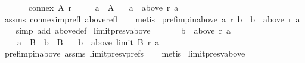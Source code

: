 \begin{isabellebody}
\ \ \isanewline
\ \ \ \ {\isachardoublequoteopen}connex\ A\ r{\isachardoublequoteclose}\ \isanewline
\ \ \ \ {\isachardoublequoteopen}a\ {\isasymin}\ A{\isachardoublequoteclose}\isanewline
\ \ \ {\isachardoublequoteopen}a\ {\isasymin}\ above\ r\ a{\isachardoublequoteclose}\isanewline
%
\isadelimproof
\ \ %
\endisadelimproof
%
\isatagproof
{}\isamarkupfalse%
\ assms\ connex{\isacharunderscore}{\kern0pt}imp{\isacharunderscore}{\kern0pt}refl\ above{\isacharunderscore}{\kern0pt}refl\isanewline
\ \ \isamarkupfalse%
\ metis%
\endisatagproof
{\isafoldproof}%
%
\isadelimproof
\isanewline
%
\endisadelimproof
\isanewline
{}\isamarkupfalse%
\ pref{\isacharunderscore}{\kern0pt}imp{\isacharunderscore}{\kern0pt}in{\isacharunderscore}{\kern0pt}above{\isacharcolon}{\kern0pt}\ {\isachardoublequoteopen}a\ {\isasympreceq}\isactrlsub r\ b\ {\isasymlongleftrightarrow}\ b\ {\isasymin}\ above\ r\ a{\isachardoublequoteclose}\isanewline
%
\isadelimproof
\ \ %
\endisadelimproof
%
\isatagproof
{}\isamarkupfalse%
\ {\isacharparenleft}{\kern0pt}simp\ add{\isacharcolon}{\kern0pt}\ above{\isacharunderscore}{\kern0pt}def{\isacharparenright}{\kern0pt}%
\endisatagproof
{\isafoldproof}%
%
\isadelimproof
\isanewline
%
\endisadelimproof
\isanewline
{}\isamarkupfalse%
\ limit{\isacharunderscore}{\kern0pt}presv{\isacharunderscore}{\kern0pt}above{\isacharcolon}{\kern0pt}\isanewline
\ \ \isanewline
\ \ \ \ {\isachardoublequoteopen}b\ {\isasymin}\ above\ r\ a{\isachardoublequoteclose}\ \isanewline
\ \ \ \ \isanewline
\ \ \ \ {\isachardoublequoteopen}a\ {\isasymin}\ B\ {\isasymand}\ b\ {\isasymin}\ B{\isachardoublequoteclose}\isanewline
\ \ \ {\isachardoublequoteopen}b\ {\isasymin}\ above\ {\isacharparenleft}{\kern0pt}limit\ B\ r{\isacharparenright}{\kern0pt}\ a{\isachardoublequoteclose}\isanewline
%
\isadelimproof
\ \ %
\endisadelimproof
%
\isatagproof
{}\isamarkupfalse%
\ pref{\isacharunderscore}{\kern0pt}imp{\isacharunderscore}{\kern0pt}in{\isacharunderscore}{\kern0pt}above\ assms\ limit{\isacharunderscore}{\kern0pt}presv{\isacharunderscore}{\kern0pt}prefs{}\isanewline
\ \ \isamarkupfalse%
\ metis%
\endisatagproof
{\isafoldproof}%
%
\isadelimproof
\isanewline
%
\endisadelimproof
\isanewline
{}\isamarkupfalse%
\ limit{\isacharunderscore}{\kern0pt}presv{\isacharunderscore}{\kern0pt}above{}{\isacharcolon}{\kern0pt}\isanewline
\ \ \isanewline

\end{isabellebody}
